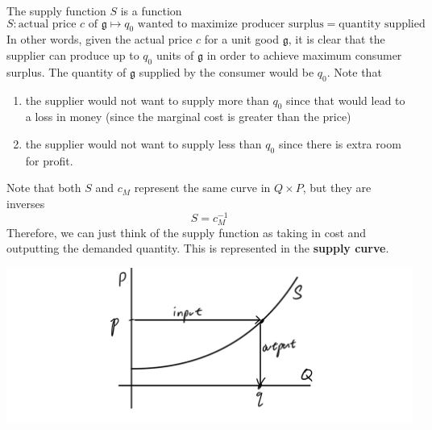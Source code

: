 \documentclass{article}
\begin{document}
    \begin{definition}
      The supply function $S$ is a function
      \[S: \text{actual price } c \text{ of } \mathfrak{g} \mapsto q_0 \text{ wanted to maximize producer surplus} = \text{quantity supplied}\]
      In other words, given the actual price $c$ for a unit good $\mathfrak{g}$, it is clear that the supplier can produce up to $q_0$ units of $\mathfrak{g}$ in order to achieve maximum consumer surplus. The quantity of $\mathfrak{g}$ supplied by the consumer would be $q_0$. Note that
      \begin{enumerate}
        \item the supplier would not want to supply more than $q_0$ since that would lead to a loss in money (since the marginal cost is greater than the price)
        \item the supplier would not want to supply less than $q_0$ since there is extra room for profit. 
      \end{enumerate}
      Note that both $S$ and $c_M$ represent the same curve in $Q \times P$, but they are inverses
      \[S = c_M^{-1}\]
      Therefore, we can just think of the supply function as taking in cost and outputting the demanded quantity. This is represented in the \textbf{supply curve}. 
      \begin{center}
        \includegraphics[scale=0.25]{img/Supply_Function.PNG}
      \end{center}
    \end{definition}
\end{document}
